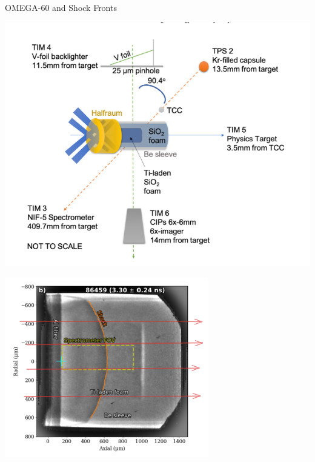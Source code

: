 \documentclass[aspectratio=169,xcolor=dvipsnames]{beamer}
\begin{document}
\begin{frame}{OMEGA-60 and Shock Fronts}
    \begin{minipage}{0.48\textwidth}
  \centering
  \includegraphics[width=\textwidth]{coaxplatform.png}
\end{minipage}
\hfill
\begin{minipage}{0.48\textwidth}
  \centering
  \includegraphics[width=\textwidth]{coax3anew.png}
\end{minipage}
\end{frame}
\end{document}
